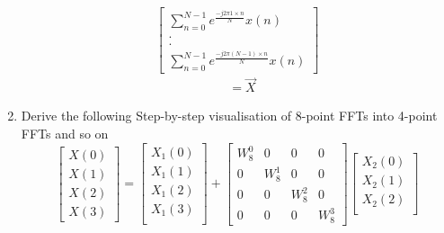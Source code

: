 \documentclass[journal,12pt,twocolumn]{IEEEtran}
\renewcommand\thesection{\arabic{section}}
\begin{document}
\begin{enumerate}[label=\arabic*.,ref=\thesection.\theenumi]
\begin{equation}
\begin{bmatrix}
                     \sum_{n=0}^{N-1}e^{\frac{-j2\pi1\times n}{N}} x(n) \\
                     .                                                  \\
                     .                                                  \\
                     \sum_{n=0}^{N-1}e^{\frac{-j2\pi (N-1)\times n}{N}} x(n)
                \end{bmatrix}
           \end{equation}
           \begin{align}
                 & =\vec{X}
           \end{align}
     \item Derive the following Step-by-step visualisation  of
           8-point FFTs into 4-point FFTs and so on
           \begin{equation}
                \begin{bmatrix}
                     X(0) \\
                     X(1) \\
                     X(2) \\
                     X(3)
                \end{bmatrix}
                =
                \begin{bmatrix}
                     X_{1}(0) \\
                     X_{1}(1) \\
                     X_{1}(2) \\
                     X_{1}(3) \\
                \end{bmatrix}
                +
                \begin{bmatrix}
                     W^{0}_{8} & 0         & 0         & 0         \\
                     0         & W^{1}_{8} & 0         & 0         \\
                     0         & 0         & W^{2}_{8} & 0         \\
                     0         & 0         & 0         & W^{3}_{8}
                \end{bmatrix}
                \begin{bmatrix}
                     X_{2}(0) \\
                     X_{2}(1) \\
                     X_{2}(2) \\

\end{bmatrix}
\end{equation}
\end{enumerate}
\end{document}
